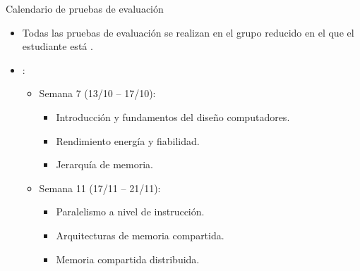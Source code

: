 \begin{frame}[t]{Calendario de pruebas de evaluación}
\begin{itemize}
  \item Todas las pruebas de evaluación se realizan en el grupo reducido
        en el que el estudiante está .

  \vfill
  \item {}:
  \begin{itemize}
    \item Semana 7 (13/10 -- 17/10): 
      \begin{itemize}
        \item Introducción y fundamentos del diseño computadores.
        \item Rendimiento energía y fiabilidad.
        \item Jerarquía de memoria.
      \end{itemize}

    \item Semana 11 (17/11 -- 21/11):
      \begin{itemize}
        \item Paralelismo a nivel de instrucción.
        \item Arquitecturas de memoria compartida.
        \item Memoria compartida distribuida.
      \end{itemize}
  \end{itemize}
\end{itemize}
\end{frame}


